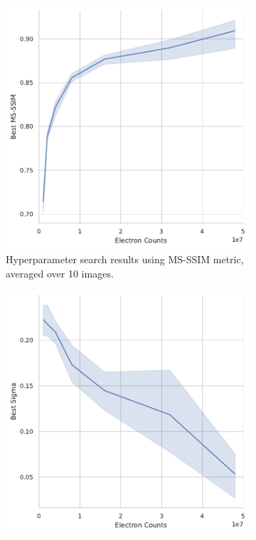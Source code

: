 \begin{figure}
    \centering
    \begin{subfigure}[t]{0.49\linewidth}
        \centering
        \includegraphics[width=\linewidth]{images/hyperparameter_msssim_averaged_10_images.pdf}
        \caption{Hyperparameter search results using MS-SSIM metric, averaged over 10 images.}
        \label{fig:hyperparameter-msssim-averaged-10-images}
    \end{subfigure}
    \hfill
    \begin{subfigure}[t]{0.49\linewidth}
        \centering
        \includegraphics[width=\linewidth]{images/hyperparameter_sigma_averaged_10_images.pdf}

\end{subfigure}
\end{figure}
